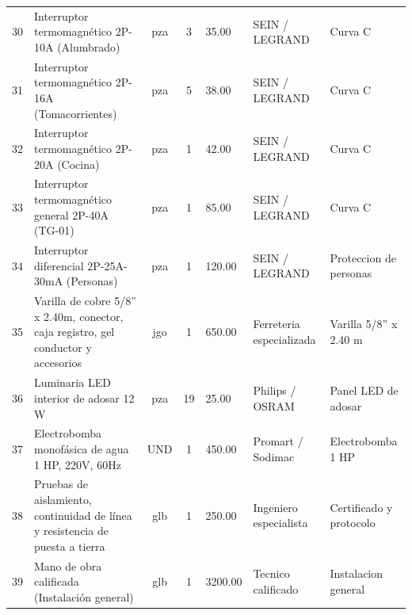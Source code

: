 \begin{longtable}{c L{4.0cm} c c R{1.4cm} L{2.0cm} L{3.5cm}}
30 & Interruptor termomagnético 2P-10A (Alumbrado) & pza & 3 & 35.00 & SEIN / LEGRAND & Curva C \\
31 & Interruptor termomagnético 2P-16A (Tomacorrientes) & pza & 5 & 38.00 & SEIN / LEGRAND & Curva C \\
32 & Interruptor termomagnético 2P-20A (Cocina) & pza & 1 & 42.00 & SEIN / LEGRAND & Curva C \\
33 & Interruptor termomagnético general 2P-40A (TG-01) & pza & 1 & 85.00 & SEIN / LEGRAND & Curva C \\
34 & Interruptor diferencial 2P-25A-30mA (Personas) & pza & 1 & 120.00 & SEIN / LEGRAND & Proteccion de personas \\
35 & Varilla de cobre 5/8'' x 2.40m, conector, caja registro, gel conductor y accesorios & jgo & 1 & 650.00 & Ferreteria especializada & Varilla 5/8'' x 2.40 m \\
36 & Luminaria LED interior de adosar 12 W & pza & 19 & 25.00 & Philips / OSRAM & Panel LED de adosar \\
37 & Electrobomba monofásica de agua 1 HP, 220V, 60Hz & UND & 1 & 450.00 & Promart / Sodimac & Electrobomba 1 HP \\
38 & Pruebas de aislamiento, continuidad de línea y resistencia de puesta a tierra & glb & 1 & 250.00 & Ingeniero especialista & Certificado y protocolo \\
39 & Mano de obra calificada (Instalación general) & glb & 1 & 3200.00 & Tecnico calificado & Instalacion general \\
\end{longtable}
\endgroup
